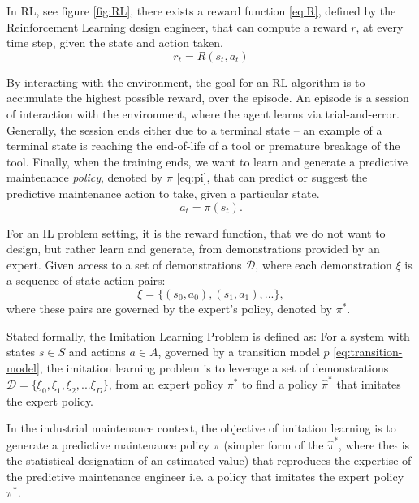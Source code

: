 \documentclass{article}
\begin{document}
In RL, see figure \ref{fig:RL}, there exists a reward function \eqref{eq:R}, defined by the Reinforcement Learning design engineer, that can compute a reward $r$, at every time step, given the state and action taken.
\begin{equation}\label{eq:R}
	r_t = R(s_t, a_t)
\end{equation}

By interacting with the environment, the goal for an RL algorithm is to accumulate the highest possible reward, over the episode. An episode is a session of interaction with the environment, where the agent learns via trial-and-error. Generally, the session ends either due to a terminal state -- an example of a terminal state is reaching the end-of-life of a tool or premature breakage of the tool. Finally, when the training ends, we want to learn and generate a predictive maintenance \textit{policy}, denoted by $\pi$ \eqref{eq:pi}, that can predict or suggest the predictive maintenance action to take, given a particular state.
\begin{equation}\label{eq:pi}
	a_t = \pi(s_t).
\end{equation}

For an IL problem setting, it is the reward function, that we do not want to design, but rather learn and generate, from demonstrations provided by an expert. Given access to a set of demonstrations $\mathcal{D}$, where each demonstration $\xi$ is a sequence of state-action pairs:
\begin{equation}\label{eq:demo}
	\xi = \{(s_0, a_0), (s_1, a_1), ...\},
\end{equation}
where these pairs are governed by the expert's policy, denoted by $\pi^{*}$.

Stated formally, the Imitation Learning Problem is defined as: For a system with states $s \in S$ and actions $a \in A$, governed by a transition model $p$ \eqref{eq:transition-model}, the imitation learning problem is to leverage a set of demonstrations $\mathcal{D} = \{\xi_0, \xi_1, \xi_2, ... \xi_D\}$, from an expert policy $\pi^{*}$ to find a policy $\hat{\pi}^{*}$ that imitates the expert policy.

In the industrial maintenance context, the objective of imitation learning is to generate a predictive maintenance policy $\pi$ (simpler form of the $\hat{\pi}^{*}$, where the $\hat{}$ is the statistical designation of an estimated value) that reproduces the expertise of the predictive maintenance engineer i.e. a policy that imitates the expert policy $\pi^{*}$.
\end{document}
